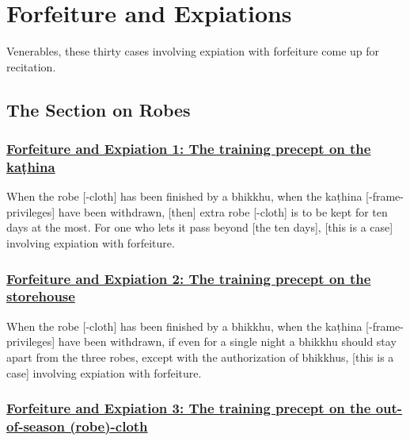 
\section{Forfeiture and Expiations}
\label{forf-exp}

\begin{center}
	Venerables, these thirty cases involving expiation with forfeiture come up for recitation.
\end{center}

\setsubsecheadstyle{\subsectionFmt}
\subsection{The Section on Robes}
\label{forf-exp-robes}

\subsubsection*{\hyperref[np1]{Forfeiture and Expiation 1: The training precept on the kaṭhina}}
\label{forf-exp1}

When the robe [-cloth] has been finished by a bhikkhu, when the kaṭhina [-frame-privileges] have been withdrawn, [then] extra robe [-cloth] is to be kept for ten days at the most. For one who lets it pass beyond [the ten days], [this is a case] involving expiation with forfeiture.



\subsubsection*{\hyperref[np2]{Forfeiture and Expiation 2: The training precept on the storehouse}}
\label{forf-exp2}

When the robe [-cloth] has been finished by a bhikkhu, when the kaṭhina [-frame-privileges] have been withdrawn, if even for a single night a bhikkhu should stay apart from the three robes, except with the authorization of bhikkhus, [this is a case] involving expiation with forfeiture.



\subsubsection*{\hyperref[np3]{Forfeiture and Expiation 3: The training precept on the out-of-season (robe)-cloth}}
\label{forf-exp3}

